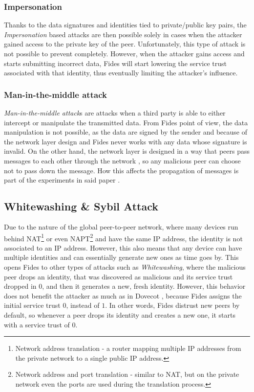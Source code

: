 \subsubsection{Impersonation}
Thanks to the data signatures and identities tied to private/public key pairs, the \textit{Impersonation} based attacks are then possible solely in cases when the attacker gained access to the private key of the peer.
Unfortunately, this type of attack is not possible to prevent completely. 
However, when the attacker gains access and starts submitting incorrect data, Fides will start lowering the service trust associated with that identity, thus eventually limiting the attacker's influence.

\subsubsection{Man-in-the-middle attack}
\textit{Man-in-the-middle attack}s are attacks when a third party is able to either intercept or manipulate the transmitted data.
From Fides point of view, the data manipulation is not possible, as the data are signed by the sender and because of the network layer \cite{nl} design and Fides never works with any data whose signature is invalid.
On the other hand, the network layer is designed in a way that peers pass messages to each other through the network \cite{nl}, so any malicious peer can choose not to pass down the message.
How this affects the propagation of messages is part of the experiments in said paper \cite{nl}.

\subsection{Whitewashing \& Sybil Attack}
\label{subsec:whitewashing-and-sybil-attack}
Due to the nature of the global peer-to-peer network, where many devices run behind NAT\footnote{Network address translation - a router mapping multiple IP addresses from the private network to a single public IP address.} or even NAPT\footnote{Network address and port translation - similar to NAT, but on the private network even the ports are used during the translation process.} and have the same IP address, the identity is not associated to an IP address.
However, this also means that any device can have multiple identities and can essentially generate new ones as time goes by.
This opens Fides to other types of attacks such as \textit{Whitewashing}, where the malicious peer drops an identity, that was discovered as malicious and its service trust dropped in $0$, and then it generates a new, fresh identity.
However, this behavior does not benefit the attacker as much as in Dovecot \cite{dita}, because Fides assigns the initial service trust $0$, instead of $1$.
In other words, Fides distrust new peers by default, so whenever a peer drops its identity and creates a new one, it starts with a service trust of $0$.

